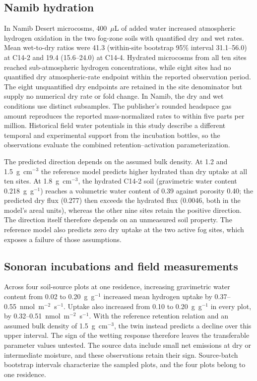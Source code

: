 \documentclass[11pt,a4paper]{article}
\begin{document}
\subsection{Namib hydration}
In Namib Desert microcosms, 400~$\mu$L of added water increased atmospheric hydrogen oxidation in the two fog-zone soils with quantified dry and wet rates. Mean wet-to-dry ratios were 41.3 (within-site bootstrap 95\% interval 31.1--56.0) at C14-2 and 19.4 (15.6--24.0) at C14-4. Hydrated microcosms from all ten sites reached sub-atmospheric hydrogen concentrations, while eight sites had no quantified dry atmospheric-rate endpoint within the reported observation period. The eight unquantified dry endpoints are retained in the site denominator but supply no numerical dry rate or fold change. In Namib, the dry and wet conditions use distinct subsamples. The publisher's rounded headspace gas amount reproduces the reported mass-normalized rates to within five parts per million. Historical field water potentials in this study describe a different temporal and experimental support from the incubation bottles, so the observations evaluate the combined retention--activation parameterization.

The predicted direction depends on the assumed bulk density. At 1.2 and 1.5~g~cm$^{-3}$ the reference model predicts higher hydrated than dry uptake at all ten sites. At 1.8~g~cm$^{-3}$, the hydrated C14-2 soil (gravimetric water content 0.218~g~g$^{-1}$) reaches a volumetric water content of 0.39 against porosity 0.40; the predicted dry flux (0.277) then exceeds the hydrated flux (0.0046, both in the model's areal units), whereas the other nine sites retain the positive direction. The direction itself therefore depends on an unmeasured soil property. The reference model also predicts zero dry uptake at the two active fog sites, which exposes a failure of those assumptions.

\subsection{Sonoran incubations and field measurements}
Across four soil-source plots at one residence, increasing gravimetric water content from 0.02 to 0.20~g~g$^{-1}$ increased mean hydrogen uptake by 0.37--0.55~nmol~m$^{-2}$~s$^{-1}$. Uptake also increased from 0.10 to 0.20~g~g$^{-1}$ in every plot, by 0.32--0.51~nmol~m$^{-2}$~s$^{-1}$. With the reference retention relation and an assumed bulk density of 1.5~g~cm$^{-3}$, the twin instead predicts a decline over this upper interval. The sign of the wetting response therefore leaves the transferable parameter values untested. The source data include small net emissions at dry or intermediate moisture, and these observations retain their sign. Source-batch bootstrap intervals characterize the sampled plots, and the four plots belong to one residence.
\end{document}
